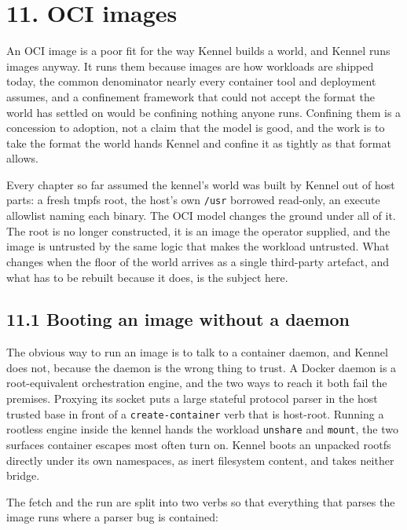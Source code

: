 \hypertarget{oci-images}{%
\chapter{11. OCI images}\label{oci-images}}

An OCI image is a poor fit for the way Kennel builds a world, and Kennel
runs images anyway. It runs them because images are how workloads are
shipped today, the common denominator nearly every container tool and
deployment assumes, and a confinement framework that could not accept
the format the world has settled on would be confining nothing anyone
runs. Confining them is a concession to adoption, not a claim that the
model is good, and the work is to take the format the world hands Kennel
and confine it as tightly as that format allows.

Every chapter so far assumed the kennel's world was built by Kennel out
of host parts: a fresh tmpfs root, the host's own \texttt{/usr} borrowed
read-only, an execute allowlist naming each binary. The OCI model
changes the ground under all of it. The root is no longer constructed,
it is an image the operator supplied, and the image is untrusted by the
same logic that makes the workload untrusted. What changes when the
floor of the world arrives as a single third-party artefact, and what
has to be rebuilt because it does, is the subject here.

\hypertarget{booting-an-image-without-a-daemon}{%
\section{11.1 Booting an image without a
daemon}\label{booting-an-image-without-a-daemon}}

The obvious way to run an image is to talk to a container daemon, and
Kennel does not, because the daemon is the wrong thing to trust. A
Docker daemon is a root-equivalent orchestration engine, and the two
ways to reach it both fail the premises. Proxying its socket puts a
large stateful protocol parser in the host trusted base in front of a
\texttt{create-container} verb that is host-root. Running a rootless
engine inside the kennel hands the workload \texttt{unshare} and
\texttt{mount}, the two surfaces container escapes most often turn on.
Kennel boots an unpacked rootfs directly under its own namespaces, as
inert filesystem content, and takes neither bridge.

The fetch and the run are split into two verbs so that everything that
parses the image runs where a parser bug is contained:

